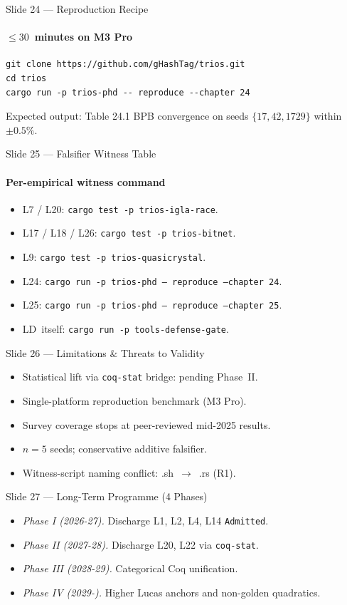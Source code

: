 \documentclass[10pt,aspectratio=169]{beamer}
\begin{document}
\begin{frame}{Slide 24 — Reproduction Recipe}
  \framesubtitle{\(\le 30\)~minutes on M3 Pro}
  \begin{verbatim}
git clone https://github.com/gHashTag/trios.git
cd trios
cargo run -p trios-phd -- reproduce --chapter 24
\end{verbatim}
  \vfill
  Expected output: Table 24.1 BPB convergence on seeds
  \(\{17, 42, 1729\}\) within \(\pm 0.5\%\).
\end{frame}

\begin{frame}{Slide 25 — Falsifier Witness Table}
  \framesubtitle{Per-empirical witness command}
  \begin{itemize}
    \item L7 / L20: \texttt{cargo test -p trios-igla-race}.
    \item L17 / L18 / L26: \texttt{cargo test -p trios-bitnet}.
    \item L9: \texttt{cargo test -p trios-quasicrystal}.
    \item L24: \texttt{cargo run -p trios-phd -- reproduce --chapter 24}.
    \item L25: \texttt{cargo run -p trios-phd -- reproduce --chapter 25}.
    \item LD~itself: \texttt{cargo run -p tools-defense-gate}.
  \end{itemize}
\end{frame}

\begin{frame}{Slide 26 — Limitations \(\&\) Threats to Validity}
  \begin{itemize}
    \item Statistical lift via \texttt{coq-stat} bridge: pending Phase~II.
    \item Single-platform reproduction benchmark (M3 Pro).
    \item Survey coverage stops at peer-reviewed mid-2025 results.
    \item \(n = 5\) seeds; conservative additive falsifier.
    \item Witness-script naming conflict: \(.\)sh~\(\to\)~\(.\)rs (R1).
  \end{itemize}
\end{frame}

\begin{frame}{Slide 27 — Long-Term Programme (4 Phases)}
  \begin{itemize}
    \item \emph{Phase I (2026-27).} Discharge L1, L2, L4, L14
      \texttt{Admitted}.
    \item \emph{Phase II (2027-28).} Discharge L20, L22 via
      \texttt{coq-stat}.
    \item \emph{Phase III (2028-29).} Categorical Coq unification.
    \item \emph{Phase IV (2029-).} Higher Lucas anchors and non-golden
      quadratics.
  \end{itemize}
\end{frame}
\end{document}
